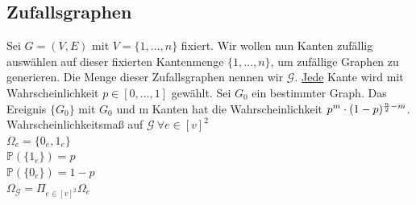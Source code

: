 \subsection{Zufallsgraphen}
Sei $G=(V,E)$ mit $V=\{1, \dots, n\}$ fixiert. Wir wollen nun Kanten zufällig auswählen auf dieser fixierten Kantenmenge $\{1, \dots, n\}$, um zufällige Graphen zu generieren. 
Die Menge dieser Zufallsgraphen nennen wir $\mathcal{G}$. \underline{Jede} Kante wird mit Wahrscheinlichkeit $p \in [0, \dots, 1]$ gewählt. 
Sei $G_0$ ein bestimmter Graph. Das Ereignis $\{G_0\}$ mit $G_0$ und m Kanten hat die Wahrscheinlichkeit $p^m \cdot (1-p)^{{n \over 2}-m}$. 
Wahrscheinlichkeitsmaß auf 
$\mathcal{G} ~ \forall e \in [v]^2$\\
$\Omega_e=\{0_e, 1_e\}$\\
$\mathbb{P}(\{1_e\})=p$\\
$\mathbb{P}(\{0_e\})=1-p$\\
$\Omega_\mathcal{G} = \Pi_{e \in [v]^2} \Omega_e$


